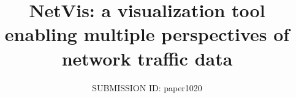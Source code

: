 
\title[NetVis Network Traffic Visualization]
      {NetVis: a visualization tool enabling multiple perspectives of network traffic data}

\author[SUBMISSION ID: paper1020]
       {SUBMISSION ID: paper1020
       }

%

